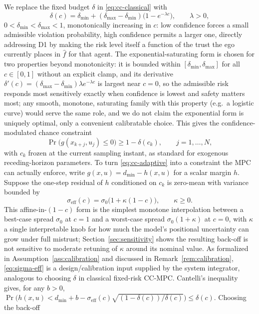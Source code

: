 \documentclass[letterpaper, 10 pt, conference]{ieeeconf}
\begin{document}
We replace the fixed budget $\delta$ in \eqref{eq:cc-classical} with
\begin{equation}
\delta(c) = \delta_{\min} + (\delta_{\max}-\delta_{\min})\big(1-e^{-\lambda c}\big), \qquad \lambda>0, \label{eq:delta-of-c}
\end{equation}
$0<\delta_{\min}<\delta_{\max}<1$, monotonically increasing in $c$: low confidence forces a small admissible violation probability, high confidence permits a larger one, directly addressing D1 by making the risk level itself a function of the trust the ego currently places in $\hat f$ for that agent. The exponential-saturating form is chosen for two properties beyond monotonicity: it is bounded within $[\delta_{\min},\delta_{\max}]$ for all $c\in[0,1]$ without an explicit clamp, and its derivative $\delta'(c)=(\delta_{\max}-\delta_{\min})\lambda e^{-\lambda c}$ is largest near $c=0$, so the admissible risk responds most sensitively exactly when confidence is lowest and safety matters most; any smooth, monotone, saturating family with this property (e.g.\ a logistic curve) would serve the same role, and we do not claim the exponential form is uniquely optimal, only a convenient calibratable choice. This gives the confidence-modulated chance constraint
\begin{equation}
\Pr\big(g(x_{k+j},u_j)\le0\big) \ge 1-\delta(c_k), \qquad j=1,\dots,N, \label{eq:cc-adaptive}
\end{equation}
with $c_k$ frozen at the current sampling instant, as standard for exogenous receding-horizon parameters.
To turn \eqref{eq:cc-adaptive} into a constraint the MPC can actually enforce, write $g(x,u)=d_{\min}-h(x,u)$ for a scalar margin $h$. Suppose the one-step residual of $h$ conditioned on $c_k$ is zero-mean with variance bounded by
\begin{equation}
\sigma_{\mathrm{eff}}(c) = \sigma_0\big(1+\kappa(1-c)\big), \qquad \kappa \ge 0. \label{eq:sigma-eff}
\end{equation}
This affine-in-$(1-c)$ form is the simplest monotone interpolation between a best-case spread $\sigma_0$ at $c=1$ and a worst-case spread $\sigma_0(1+\kappa)$ at $c=0$, with $\kappa$ a single interpretable knob for how much the model's positional uncertainty can grow under full mistrust; Section~\ref{sec:sensitivity} shows the resulting back-off is not sensitive to moderate retuning of $\kappa$ around its nominal value. As formalized in Assumption~\ref{ass:calibration} and discussed in Remark~\ref{rem:calibration}, \eqref{eq:sigma-eff} is a design/calibration input supplied by the system integrator, analogous to choosing $\delta$ in classical fixed-risk CC-MPC. Cantelli's inequality gives, for any $b>0$, $\Pr\big(h(x,u) < d_{\min}+b - \sigma_{\mathrm{eff}}(c)\sqrt{(1-\delta(c))/\delta(c)}\big) \le \delta(c)$. Choosing the back-off
\end{document}
